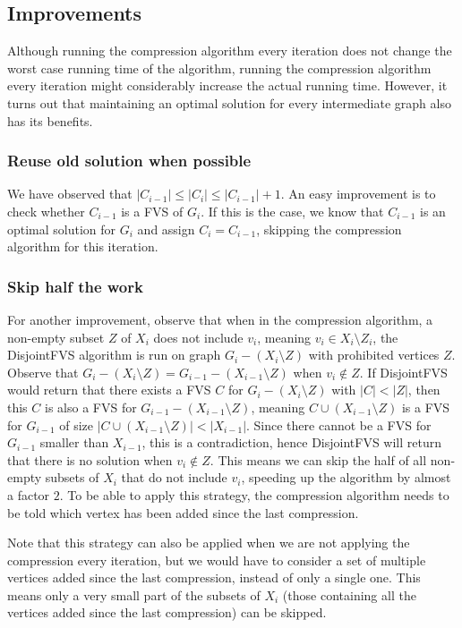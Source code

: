 \subsection{Improvements}
Although running the compression algorithm every iteration does not change the worst case running time of the algorithm, running the compression algorithm every iteration might considerably increase the actual running time. However, it turns out that maintaining an optimal solution for every intermediate graph also has its benefits. 

\subsubsection{Reuse old solution when possible}
We have observed that $|C_{i-1}| \leq |C_i| \leq |C_{i-1}|+1$. An easy improvement is to check whether $C_{i-1}$ is a FVS of $G_i$. If this is the case, we know that $C_{i-1}$ is an optimal solution for $G_i$ and assign $C_i = C_{i-1}$, skipping the compression algorithm for this iteration.

\subsubsection{Skip half the work}
For another improvement, observe that when in the compression algorithm, a non-empty subset $Z$ of $X_i$ does not include $v_i$, meaning $v_i \in X_i\setminus Z_i$, the {\sc DisjointFVS} algorithm is run on graph $G_i-(X_i\setminus Z)$ with prohibited vertices $Z$. Observe that $G_i-(X_i\setminus Z) = G_{i-1}-(X_{i-1}\setminus Z)$ when $v_i \not\in Z$. If {\sc DisjointFVS} would return that there exists a FVS $C$ for $G_i-(X_i\setminus Z)$ with $|C|<|Z|$, then this $C$ is also a FVS for $G_{i-1}-(X_{i-1}\setminus Z)$, meaning $C \cup (X_{i-1}\setminus Z)$ is a FVS for $G_{i-1}$ of size $|C \cup (X_{i-1}\setminus Z)| < |X_{i-1}|$. Since there cannot be a FVS for $G_{i-1}$ smaller than $X_{i-1}$, this is a contradiction, hence {\sc DisjointFVS} will return that there is no solution when $v_i \not\in Z$. This means we can skip the half of all non-empty subsets of $X_i$ that do not include $v_i$, speeding up the algorithm by almost a factor $2$. To be able to apply this strategy, the compression algorithm needs to be told which vertex has been added since the last compression.

Note that this strategy can also be applied when we are not applying the compression every iteration, but we would have to consider a set of multiple vertices added since the last compression, instead of only a single one. This means only a very small part of the subsets of $X_i$ (those containing all the vertices added since the last compression) can be skipped.

